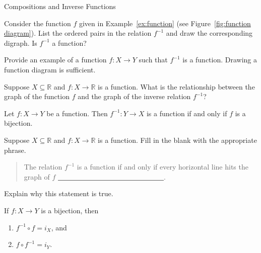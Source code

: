 \begin{section}{Compositions and Inverse Functions}
\begin{problem}
Consider the function $f$ given in Example~\ref{ex:function} (see Figure~\ref{fig:function diagram}). List the ordered pairs in the relation $f^{-1}$ and draw the corresponding digraph. Is $f^{-1}$ a function?
\end{problem}


\begin{problem}
Provide an example of a function $f:X\to Y$ such that $f^{-1}$ is a function. Drawing a function diagram is sufficient.
\end{problem}

\begin{problem}
Suppose $X\subseteq \mathbb{R}$ and $f:X\to \mathbb{R}$ is a function. What is the relationship between the graph of the function $f$ and the graph of the inverse relation $f^{-1}$?
\end{problem}

\begin{theorem}\label{thm:inverse function iff bijection}
Let $f:X\to Y$ be a function.  Then $f^{-1}:Y\to X$ is a function if and only if $f$ is a bijection.
\end{theorem}

\begin{problem}
Suppose $X\subseteq \mathbb{R}$ and $f:X\to \mathbb{R}$ is a function. Fill in the blank with the appropriate phrase.
\begin{quote}
The relation $f^{-1}$ is a function if and only if every horizontal line hits the graph of $f$ \underline{\ \ \ \ \ \ \ \  \ \ \ \ \ \ \ \ \ \ \ \ \ \ \ \ \ \ \ \ \ \ }.%
\end{quote}
Explain why this statement is true.
\end{problem}

\begin{theorem}\label{thm:comp of inverses}
If $f:X\to Y$ is a bijection, then
\begin{enumerate}[label=\textrm{(\alph*)}]
\item $f^{-1}\circ f=i_X$, and
\item $f\circ f^{-1}=i_Y$.
\end{enumerate}
\end{theorem}


\end{section}
